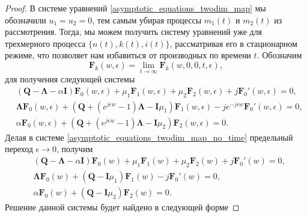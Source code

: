 \begin{proof}
	В системе уравнений \eqref{asymptotic_equations_twodim_map} мы обозначили $u_{1} = u_{2} = 0$, тем самым убирая процессы $m_{1}(t)$ и $m_{2}(t)$ из рассмотрения. Тогда, мы можем получить систему уравнений уже для трехмерного процесса $\{n(t),k(t),i(t)\}$, рассматривая его в стационарном режиме, что позволяет нам избавиться от производных по времени $t$.
	Обозначим 
	\begin{equation*}
		\boldsymbol{F}_{k}(w,\epsilon) = \lim_{t \xrightarrow{} \infty} \boldsymbol{F}_{k}(w,0,0,t,\epsilon),
	\end{equation*}
для получения следующей системы
\begin{equation}
		 \label{asymptotic_equations_twodim_map_no_time}
		 \begin{split}
		 &(\boldsymbol{Q}-\boldsymbol{\Lambda}-\alpha\boldsymbol{I})\boldsymbol{F}_{0}(w,\epsilon) + \mu_{1} \boldsymbol{F}_{1}(w,\epsilon)  +  \mu_{2}\boldsymbol{F}_{2}(w,\epsilon) + j
		 \boldsymbol{F}_{0}'(w,\epsilon)  = 0,
		\\
		 &\boldsymbol{\Lambda} \boldsymbol{F}_{0}(w,\epsilon) +  (\boldsymbol{Q}+(e^{j\epsilon w}-1)\boldsymbol{\Lambda} - \boldsymbol{I}\mu_{1})\boldsymbol{F}_{1}(w,\epsilon) - j e^{-j\epsilon w}
		 \boldsymbol{F}_{0}'(w,\epsilon)  = 0,
		\\
		&\alpha \boldsymbol{F}_{0}(w,\epsilon) + (\boldsymbol{Q}+(e^{j\epsilon w}-1)\boldsymbol{\Lambda} - \boldsymbol{I}\mu_{2})\boldsymbol{F}_{2}(w,\epsilon)  = 0.
	\end{split}
\end{equation}  
Делая в системе \eqref{asymptotic_equations_twodim_map_no_time} предельный переход $\epsilon \xrightarrow{} 0$, получим
\begin{equation}
	\label{asymptotic_equations_twodim_map_no_limit}
	\begin{split}
		&(\boldsymbol{Q}-\boldsymbol{\Lambda}-\alpha\boldsymbol{I})\boldsymbol{F}_{0}(w) + \mu_{1} \boldsymbol{F}_{1}(w)  +  \mu_{2}\boldsymbol{F}_{2}(w) + j
		\boldsymbol{F}_{0}'(w)  = 0,
		\\
		&\boldsymbol{\Lambda} \boldsymbol{F}_{0}(w) +  (\boldsymbol{Q} - \boldsymbol{I}\mu_{1})\boldsymbol{F}_{1}(w) - j
		\boldsymbol{F}_{0}'(w)  = 0,
		\\
		&\alpha \boldsymbol{F}_{0}(w) + (\boldsymbol{Q} - \boldsymbol{I}\mu_{2})\boldsymbol{F}_{2}(w)  = 0.
	\end{split}
\end{equation}
Решение данной системы будет найдено в следующей форме

\end{proof}
